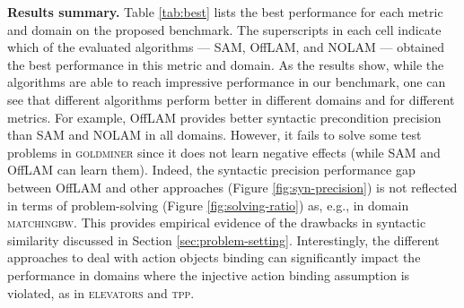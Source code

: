 \documentclass{article}
\newcommand{\miniparagraph}[1]{\textbf{#1.}}
\theoremstyle{definition}
\theoremstyle{remark}
\newcommand{\sam}{\ac{SAM}\xspace}
\newcommand{\nolam}{NOLAM\xspace}
\newcommand{\offlam}{OffLAM\xspace}
\newcommand{\samshort}{SAM}
\newif\ifaddcomments
\newcommand{\roni}[1]{\ifaddcomments{\textcolor{red}{[Roni: #1]}}\fi}
\newcommand{\leo}[1]{\ifaddcomments{\textcolor{pink}{[Leonardo: #1]}}\fi}
\begin{document}

\miniparagraph{Results summary} 
Table \ref{tab:best} lists the best performance for each metric and domain on the proposed benchmark. The superscripts in each cell indicate which of the evaluated algorithms --- \sam{}, \offlam{}, and \nolam{} --- obtained the best performance in this metric and domain. As the results show, while the algorithms are able to reach impressive performance in our benchmark, one can see that different algorithms perform better in different domains and for different metrics. 
For example, \offlam{} provides better syntactic precondition precision than \samshort{} and \nolam{} in all domains. However, it fails to solve some test problems in \textsc{goldminer} since it does not learn negative effects (while \sam and \offlam{} can learn them). 
Indeed, the syntactic precision performance gap between \offlam{} and other approaches (Figure \ref{fig:syn-precision}) is not reflected in terms of problem-solving (Figure \ref{fig:solving-ratio}) as, e.g., in domain \textsc{matchingbw}. 
This provides empirical evidence of the drawbacks in syntactic similarity discussed in Section \ref{sec:problem-setting}.
Interestingly, the different approaches to deal with action objects binding can significantly impact the performance in domains where the injective action binding assumption is violated, as in \textsc{elevators} and \textsc{tpp}.  


\end{document}
